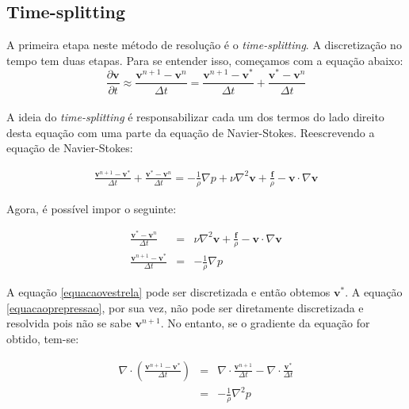 \documentclass[introducao.tex]{subfiles}
\begin{document}
\subsection{Time-splitting} A primeira etapa neste método de resolução é o \textit{time-splitting}. A discretização no tempo tem duas etapas. Para se entender isso, começamos com a equação abaixo:
\begin{equation}
\frac{\partial \textbf{v}}{\partial t}\approx \frac{\textbf{v}^{n+1}-\textbf{v}^n}{\Delta t}=\frac{\textbf{v}^{n+1}-\textbf{v}^*}{\Delta t}+\frac{\textbf{v}^{*}-\textbf{v}^n}{\Delta t} 
\end{equation}

\paragraph{} A ideia do \textit{time-splitting} é responsabilizar cada um dos termos do lado direito desta equação com uma parte da equação de Navier-Stokes. Reescrevendo a equação de Navier-Stokes:

\begin{eqnarray*}
\frac{\textbf{v}^{n+1}-\textbf{v}^*}{\Delta t}+\frac{\textbf{v}^{*}-\textbf{v}^n}{\Delta t}=-\frac{1}{\rho}\nabla p + \nu\nabla ^2 \textbf{v} + \frac{\textbf{f}}{\rho} - \textbf{v}\cdot \nabla \textbf{v}
\end{eqnarray*}

Agora, é possível impor o seguinte:

\begin{eqnarray}
\frac{\textbf{v}^{*}-\textbf{v}^n}{\Delta t}&=& \nu\nabla ^2 \textbf{v} + \frac{\textbf{f}}{\rho} - \textbf{v}\cdot \nabla \textbf{v}\label{equacaovestrela}\\
\frac{\textbf{v}^{n+1}-\textbf{v}^*}{\Delta t}&=&-\frac{1}{\rho}\nabla p\label{equacaoprepressao}
\end{eqnarray}

A equação \ref{equacaovestrela} pode ser discretizada e então obtemos $\textbf{v}^*$. A equação \ref{equacaoprepressao}, por sua vez, não pode ser diretamente discretizada e resolvida pois não se sabe $\textbf{v}^{n+1}$. No entanto, se o gradiente da equação for obtido, tem-se:

\begin{eqnarray*}
\nabla\cdot \left(\frac{\textbf{v}^{n+1}-\textbf{v}^*}{\Delta t}\right)&=&\nabla\cdot\frac{\textbf{v}^{n+1}}{\Delta t}-\nabla\cdot \frac{\textbf{v}^*}{\Delta t}\\
&=&-\frac{1}{\rho}\nabla^2 p
\end{eqnarray*}
\end{document}
